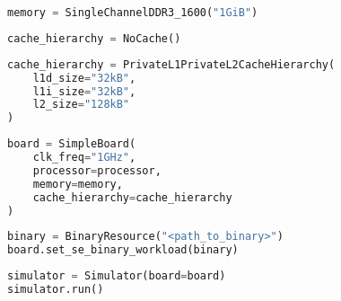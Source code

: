 \begin{lstlisting}[language=python, caption={Gem5 Memory Definition}, label={lst:gem5_processor}]
memory = SingleChannelDDR3_1600("1GiB")
\end{lstlisting}

\begin{lstlisting}[language=python, caption={Gem5 Memory Definition}, label={lst:gem5_processor}]
cache_hierarchy = NoCache()
\end{lstlisting}



\begin{lstlisting}[language=python, caption={Gem5 Memory Definition}, label={lst:gem5_processor}]
cache_hierarchy = PrivateL1PrivateL2CacheHierarchy(
    l1d_size="32kB",
    l1i_size="32kB",
    l2_size="128kB"
)
\end{lstlisting}


\begin{lstlisting}[language=python, caption={Gem5 Board Definition}, label={lst:gem5_board}]
board = SimpleBoard(
    clk_freq="1GHz",
    processor=processor,
    memory=memory,
    cache_hierarchy=cache_hierarchy
)
\end{lstlisting}
\begin{lstlisting}[language=python, caption={Gem5 Memory Definition}, label={lst:gem5_processor}]
binary = BinaryResource("<path_to_binary>")
board.set_se_binary_workload(binary)
\end{lstlisting}

\begin{lstlisting}[language=python, caption={Gem5 Memory Definition}, label={lst:gem5_processor}]
simulator = Simulator(board=board)
simulator.run()
\end{lstlisting}